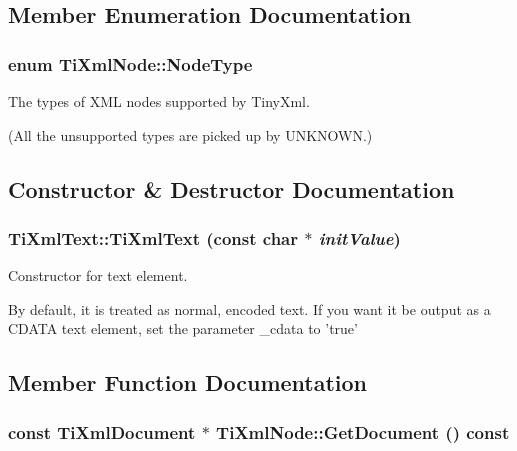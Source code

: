 \subsection{Member Enumeration Documentation}
\subsubsection{\setlength{\rightskip}{0pt plus 5cm}enum {\bf Ti\-Xml\-Node::Node\-Type}\hspace{0.3cm}{\tt  [inherited]}}\label{classTiXmlNode_TiXmlUnknownw7}


The types of XML nodes supported by Tiny\-Xml. 

(All the unsupported types are picked up by UNKNOWN.)

\subsection{Constructor \& Destructor Documentation}
\subsubsection{\setlength{\rightskip}{0pt plus 5cm}Ti\-Xml\-Text::Ti\-Xml\-Text (const char $\ast$ {\em init\-Value})\hspace{0.3cm}{\tt  [inline]}}\label{classTiXmlText_TiXmlTexta0}


Constructor for text element. 

By default, it is treated as normal, encoded text. If you want it be output as a CDATA text element, set the parameter \_\-cdata to 'true'

\subsection{Member Function Documentation}
\subsubsection{\setlength{\rightskip}{0pt plus 5cm}const {\bf Ti\-Xml\-Document} $\ast$ Ti\-Xml\-Node::Get\-Document () const\hspace{0.3cm}{\tt  [inherited]}}\label{classTiXmlNode_TiXmlUnknowna63}


